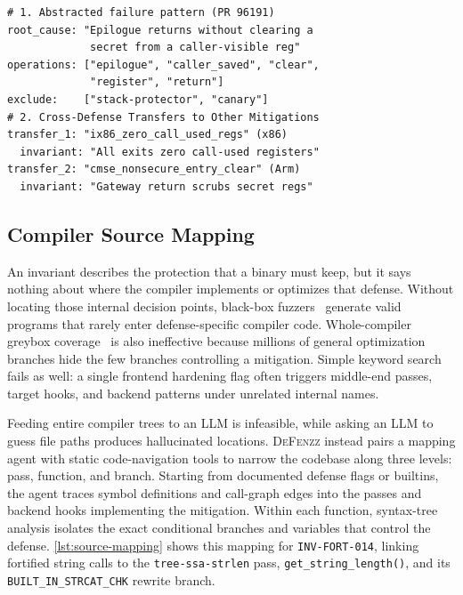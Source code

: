 \documentclass[conference,compsoc]{IEEEtran}
\begin{document}
\par\vspace{5pt}\noindent\begin{minipage}{\columnwidth}
\begin{lstlisting}[language={}, keepspaces=true, morekeywords={root_cause,operations,exclude,transfer_1,transfer_2,invariant}, morecomment={[l]{\#}}, morestring={[b]"}, numbers=none, xleftmargin=3pt, framexleftmargin=0pt, caption={Mechanism-neutral bug abstraction and cross-defense invariant transfer from GCC PR~96191.}, label={lst:rag-transfer}]
# 1. Abstracted failure pattern (PR 96191)
root_cause: "Epilogue returns without clearing a
             secret from a caller-visible reg"
operations: ["epilogue", "caller_saved", "clear",
             "register", "return"]
exclude:    ["stack-protector", "canary"]
# 2. Cross-Defense Transfers to Other Mitigations
transfer_1: "ix86_zero_call_used_regs" (x86)
  invariant: "All exits zero call-used registers"
transfer_2: "cmse_nonsecure_entry_clear" (Arm)
  invariant: "Gateway return scrubs secret regs"
\end{lstlisting}
\end{minipage}\par\vspace{5pt}

\subsection{Compiler Source Mapping}\label{sec:mapping}\label{sec:instrumentation}\label{sec:offline}

An invariant describes the protection that a binary must keep, but it says nothing about where the compiler implements or optimizes that defense. Without locating those internal decision points, black-box fuzzers~\cite{yang2011csmith,xia2024fuzz4all} generate valid programs that rarely enter defense-specific compiler code. Whole-compiler greybox coverage~\cite{bohme2017aflgo,ou2024metamut} is also ineffective because millions of general optimization branches hide the few branches controlling a mitigation. Simple keyword search fails as well: a single frontend hardening flag often triggers middle-end passes, target hooks, and backend patterns under unrelated internal names.

Feeding entire compiler trees to an LLM is infeasible, while asking an LLM to guess file paths produces hallucinated locations. \textsc{DeFenzz} instead pairs a mapping agent with static code-navigation tools to narrow the codebase along three levels: pass, function, and branch. Starting from documented defense flags or builtins, the agent traces symbol definitions and call-graph edges into the passes and backend hooks implementing the mitigation. Within each function, syntax-tree analysis isolates the exact conditional branches and variables that control the defense. \autoref{lst:source-mapping} shows this mapping for \texttt{INV-FORT-014}, linking fortified string calls to the \texttt{tree-ssa-strlen} pass, \texttt{get\_\allowbreak string\_\allowbreak length()}, and its \texttt{BUILT\_IN\_\allowbreak STRCAT\_CHK} rewrite branch.
\end{document}
